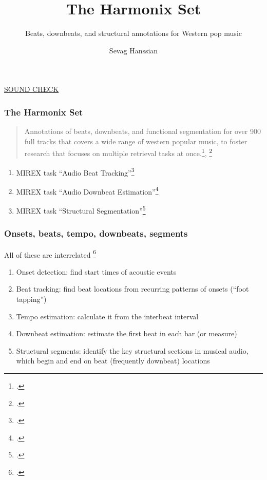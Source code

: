 \documentclass{beamer}
\title{The Harmonix Set}
\subtitle{Beats, downbeats, and structural annotations for Western pop music}
\author{Sevag Hanssian}
\institute{MUMT 621, Winter 2021}
\begin{document}
\begin{frame}
\maketitle
\href{run:./gangnam.wav}{SOUND CHECK}
\end{frame}

\begin{frame}
	\frametitle{The Harmonix Set}
	\begin{quote}
	Annotations of beats, downbeats, and functional segmentation for over 900 full tracks that covers a wide range of western popular music, to foster research that focuses on multiple retrieval tasks at once.\footcite{harmonixpaper}, \footcite{harmonixrepo}
	\end{quote}
	\begin{enumerate}
		\item
			MIREX task ``Audio Beat Tracking''\footcite{mirexabt}
		\item
			MIREX task ``Audio Downbeat Estimation''\footcite{mirexade}
		\item
			MIREX task ``Structural Segmentation''\footcite{mirexss}
	\end{enumerate}
\end{frame}


\begin{frame}
	\frametitle{Onsets, beats, tempo, downbeats, segments}
	All of these are interrelated \footcite{beattempo}\\
	\begin{enumerate}
		\item
			Onset detection: find start times of acoustic events
		\item
			Beat tracking: find beat locations from recurring patterns of onsets (``foot tapping'')
		\item
			Tempo estimation: calculate it from the interbeat interval
		\item
			Downbeat estimation: estimate the first beat in each bar (or measure)
		\item
			Structural segments: identify the key structural sections in musical audio, which begin and end on beat (frequently downbeat) locations
	\end{enumerate}
\end{frame}
\end{document}
